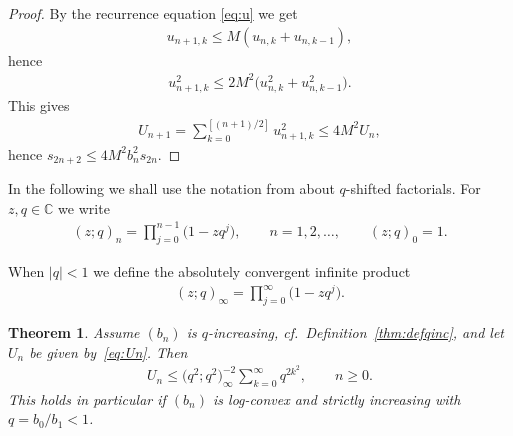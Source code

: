 \documentclass[11pt]{article}
\numberwithin{equation}{section}
\newtheorem{thm}{Theorem}[section]
\begin{document}
\begin{proof} By the recurrence equation \eqref{eq:u} we get
\begin{gather*}
u_{n+1,k}\le M(u_{n,k}+u_{n,k-1}),
\end{gather*}
hence
\begin{gather*}
u_{n+1,k}^2\le 2M^2\big(u_{n,k}^2+u_{n,k-1}^2\big).
\end{gather*}
This gives
\begin{gather*}
U_{n+1}=\sum_{k=0}^{[(n+1)/2]} u_{n+1,k}^2\le 4M^2 U_n,
\end{gather*}
hence $s_{2n+2}\le 4M^2b_n^2s_{2n}$.
\end{proof}

In the following we shall use the notation from \cite{G:R} about $q$-shifted factorials. For $z,q\in\mathbb C$ we write
\begin{gather}\label{eq:qshift}
(z;q)_n=\prod_{j=0}^{n-1}\big(1-zq^{j}\big),\qquad n=1,2,\ldots,\qquad (z;q)_0=1.
\end{gather}

When $|q|<1$ we define the absolutely convergent infinite product
\begin{gather}\label{eq:q-infty}
(z;q)_{\infty}=\prod_{j=0}^\infty\big(1-zq^j\big).
\end{gather}


\setcounter{section}{3}
\setcounter{subsection}{0}
\setcounter{subsubsection}{0}
\setcounter{thm}{5}
\setcounter{equation}{12}
\begin{thm}\label{thm:logconvex}Assume $(b_n)$ is $q$-increasing, cf.\ Definition~{\rm \ref{thm:defqinc}}, and let $U_n$ be given by~\eqref{eq:Un}. Then
 \begin{gather*}%
U_n\le \big(q^2;q^2\big)_\infty^{-2} \sum_{k=0}^{\infty}q^{2k^2},\qquad n\ge 0.
\end{gather*}
This holds in particular if $(b_n)$ is log-convex and strictly increasing with $q=b_0/b_1<1$.
\end{thm}
\end{document}
